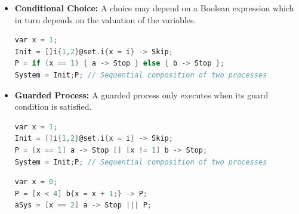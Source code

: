 \documentclass[10pt, landscape]{article}
\begin{document}
\begin{multicols*}{3}
  \begin{center}
  \end{center}


  \begin{itemize}
    \item \textbf{Conditional Choice:} A choice may depend on a Boolean expression which in turn depends on the valuation of the variables.
\begin{lstlisting}[language=C]
var x = 1;
Init = []i{1,2}@set.i{x = i} -> Skip;
P = if (x == 1) { a -> Stop } else { b -> Stop };
System = Init;P; // Sequential composition of two processes
\end{lstlisting}
    \item \textbf{Guarded Process:} A guarded process only executes when its guard condition is satisfied.
\begin{lstlisting}[language=C]
var x = 1;
Init = []i{1,2}@set.i{x = i} -> Skip;
P = [x == 1] a -> Stop [] [x != 1] b -> Stop;
System = Init;P; // Sequential composition of two processes
\end{lstlisting}
  \begin{center}
  \end{center}
\begin{lstlisting}[language=C]
var x = 0;
P = [x < 4] b{x = x + 1;} -> P;
aSys = [x == 2] a -> Stop ||| P;
\end{lstlisting}
  \begin{center}
  \end{center}
  \end{itemize}


\end{multicols*}
\end{document}
